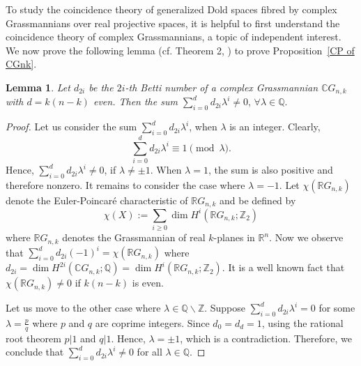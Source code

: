 \documentclass{amsart}
\newtheorem{lemma}[theorem]{Lemma}
\newcommand{\propref}[1]{Proposition~\ref{#1}}
\begin{document}
	To study the coincidence theory of generalized Dold spaces fibred by complex Grassmannians over real projective spaces, it is helpful to first understand the coincidence theory of complex Grassmannians, a topic of independent interest. We now prove the following lemma (cf. Theorem 2, \cite{glover-homer}) to prove \propref{CP of CGnk}.
	\begin{lemma}\label{sum neq 0}
		Let $d_{2i}$ be the $2i$-th Betti number of a complex Grassmannian $\mathbb CG_{n,k}$ with $d=k(n-k)$ even. Then the sum \(\sum _{i=0}^d d_{2i}\lambda^i\neq 0,\, \forall \lambda \in \mathbb Q.\)
	\end{lemma}
	\begin{proof}
		Let us consider the sum $\sum_{i=0}^d d_{2i}\lambda^i$, when $\lambda$ is an integer. 
		Clearly, $$\sum_{i=0}^d d_{2i}\lambda^i \equiv 1 \pmod{\lambda}.$$ %
		Hence, $\sum_{i=0}^d d_{2i}\lambda^i \neq 0$, if $\lambda \neq \pm 1$. When $\lambda = 1$, the sum is also positive and therefore nonzero. It remains to consider the case where $\lambda = -1$.
		Let $\chi(\mathbb{R}G_{n,k})$ denote the Euler-Poincaré characteristic of $\mathbb{R}G_{n,k}$ and be defined by $$\chi(X):=\sum_{i\ge0}\dim H^i(\mathbb{R}G_{n,k};\mathbb{Z}_2)$$ where $\mathbb{R}G_{n,k}$ denotes the Grassmannian of real $k$-planes in $\mathbb{R}^n$.
		Now we observe that 
		$\sum_{i=0}^d d_{2i}(-1)^i = \chi(\mathbb{R}G_{n,k})$ where $d_{2i} = \operatorname{dim} H^{2i}(\mathbb{C}G_{n,k}; \mathbb{Q}) = \dim H^{i}(\mathbb{R}G_{n,k}; \mathbb{Z}_2)$. 
		It is a well known fact that $\chi(\mathbb{R}G_{n,k}) \neq 0$ if $k(n-k)$ is even. 
		
		Let us move to the other case where $\lambda\in \mathbb{Q}\backslash \mathbb{Z}$. Suppose $\sum_{i=0}^{d} d_{2i}\lambda^i =0$ for some $\lambda = \frac{p}{q}$ where $p$ and $q$ are coprime integers. Since $d_0 =d_d =1$, using the rational root theorem $p|1$ and $q|1$. Hence, $\lambda = \pm 1$, which is a contradiction. Therefore, we conclude that $\sum_{i=0}^{d} d_{2i}\lambda^i \neq 0$ for all $\lambda\in \mathbb Q$. 

	\end{proof}
	
\end{document}
